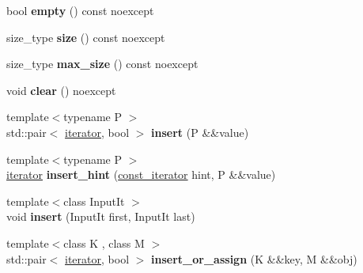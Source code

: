 \begin{DoxyCompactItemize}
bool {\bfseries empty} () const noexcept
\item 
\mbox{\label{classtsl_1_1detail__robin__hash_1_1robin__hash_ab371573bb534343b56cec00bfd35825d}} 
size\+\_\+type {\bfseries size} () const noexcept
\item 
\mbox{\label{classtsl_1_1detail__robin__hash_1_1robin__hash_a6a7d8c3c60013a360bd4f95fa186c9e5}} 
size\+\_\+type {\bfseries max\+\_\+size} () const noexcept
\item 
\mbox{\label{classtsl_1_1detail__robin__hash_1_1robin__hash_afbddec95c84245c737fd2e0aa7e39fe3}} 
void {\bfseries clear} () noexcept
\item 
\mbox{\label{classtsl_1_1detail__robin__hash_1_1robin__hash_aa0cf8f98045eb7275f9ded9085abf0e9}} 
{\footnotesize template$<$typename P $>$ }\\std\+::pair$<$ \mbox{\hyperlink{classtsl_1_1detail__robin__hash_1_1robin__hash_1_1robin__iterator}{iterator}}, bool $>$ {\bfseries insert} (P \&\&value)
\item 
\mbox{\label{classtsl_1_1detail__robin__hash_1_1robin__hash_a6006219185b630530263c0cf52d7c01a}} 
{\footnotesize template$<$typename P $>$ }\\\mbox{\hyperlink{classtsl_1_1detail__robin__hash_1_1robin__hash_1_1robin__iterator}{iterator}} {\bfseries insert\+\_\+hint} (\mbox{\hyperlink{classtsl_1_1detail__robin__hash_1_1robin__hash_1_1robin__iterator}{const\+\_\+iterator}} hint, P \&\&value)
\item 
\mbox{\label{classtsl_1_1detail__robin__hash_1_1robin__hash_aaf74fa2603261bfe3f1b547dca46e626}} 
{\footnotesize template$<$class Input\+It $>$ }\\void {\bfseries insert} (Input\+It first, Input\+It last)
\item 
\mbox{\label{classtsl_1_1detail__robin__hash_1_1robin__hash_a501965732b22e289a0b282bd904bab82}} 
{\footnotesize template$<$class K , class M $>$ }\\std\+::pair$<$ \mbox{\hyperlink{classtsl_1_1detail__robin__hash_1_1robin__hash_1_1robin__iterator}{iterator}}, bool $>$ {\bfseries insert\+\_\+or\+\_\+assign} (K \&\&key, M \&\&obj)

\end{DoxyCompactItemize}
